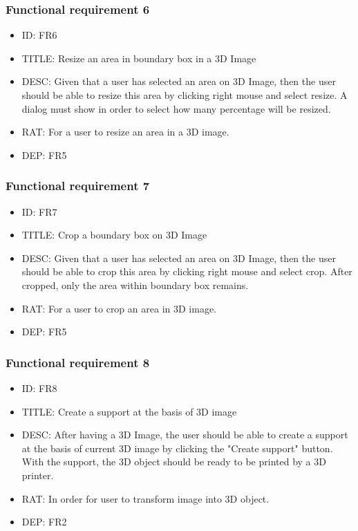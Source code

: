 \documentclass[11pt]{article}
\begin{document}
\subsubsection{Functional requirement 6}
\begin{itemize}
\item ID: FR6
\item TITLE: Resize an area in boundary box in a 3D Image
\item DESC: Given that a user has selected an area on 3D Image, then the user should be able to resize this area by clicking right mouse and select resize. A dialog must show in order to select how many percentage will be resized.
\item RAT: For a user to resize an area in a 3D image.
\item DEP: FR5
\end{itemize}
\subsubsection{Functional requirement 7}
\begin{itemize}
\item ID: FR7
\item TITLE: Crop a boundary box on 3D Image
\item DESC: Given that a user has selected an area on 3D Image, then the user should be able to crop this area by clicking right mouse and select crop. After cropped, only the area within boundary box remains.
\item RAT: For a user to crop an area in 3D image.
\item DEP: FR5
\end{itemize}
\subsubsection{Functional requirement 8}
\begin{itemize}
\item ID: FR8
\item TITLE: Create a support at the basis of 3D image
\item DESC: After having a 3D Image, the user should be able to create a support at the basis of current 3D image by clicking the "Create support" button. With the support, the 3D object should be ready to be printed by a 3D printer.
\item RAT: In order for user to transform image into 3D object.
\item DEP: FR2
\end{itemize}
\end{document}

